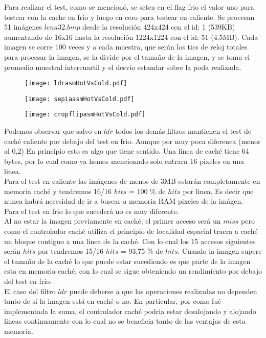 Para realizar el test, como se mencionó, se setea en el flag frio el valor uno para testear con la cache en frio y luego en cero para testear en caliente.
Se procesan 51 imágenes $lena32.bmp$ desde la resolución 424x424 con el id: 1 (539KB) aumentando de 16x16 hasta la resolución 1224x1224 con el id: 51 (4.5MB). Cada imagen se corre 100 veces y a cada muestra, que serán los tics de reloj totales para procesar la imagen, se la divide por el tamaño de la imagen, y se toma el promedio muestral intercuartil y el desvío estandar sobre la poda realizada.

\begin{figure}[h]
  \begin{center}
	\texttt{[image: ldrasmHotVsCold.pdf]}
  \end{center}
\end{figure}

\begin{figure}[h]
  \begin{center}
	\texttt{[image: sepiaasmHotVsCold.pdf]}
  \end{center}
\end{figure}

\begin{figure}[h]
  \begin{center}
	\texttt{[image: cropflipasmHotVsCold.pdf]}
  \end{center}
\end{figure}

Podemos observar que salvo en $ldr$ todos los demás filtros mantienen el test de caché caliente por debajo del test en frio. Aunque por muy poca diferenca (menor al 0,2)
En principio esto es algo que tiene sentido. Una linea de caché tiene 64 bytes, por lo cual como ya hemos mencionado solo entrarn 16 pixeles en una linea. \\

Para el test en caliente las imágenes de menos de 3MB estarán completamente en memoria caché y tendremos 16/16 $hits$ = 100 $\%$ de $hits$ por linea. Es decir que nunca habrá necesidad de ir a buscar a memoria RAM pixeles de la imágen.\\ 
Para el test en frio lo que sucederá no es muy diferente. \\

Al no estar la imagen previamente en caché, el primer acceso será un $miss$ pero como el controlador caché utiliza el principio de localidad espacial traera a caché un bloque contiguo a una linea de la caché. Con lo cual los 15 accesos siguientes serán $hits$ por tendremos 15/16 $hits$ = 93,75 $\%$ de $hits$. 
Cuando la imagen supere el tamaño de la caché lo que puede estar sucediendo es que parte de la imagen esta en memoria caché, con lo cual se sigue obteniendo un rendimiento por debajo del test en frio.\\

El caso del filtro $ldr$ puede deberse a que las operaciones realizadas no dependen tanto de si la imagen está en caché o no. En particular, por como fué implementada la suma, el controlador caché podria estar desalojando y alojando lineas continuamente con lo cual no se beneficia tanto de las ventajas de esta memoria.

